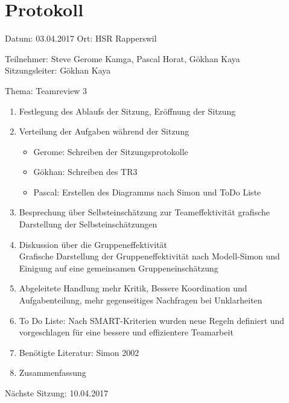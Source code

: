 \chapter{Protokoll}

Datum: 03.04.2017
Ort: HSR Rapperswil

Teilnehmer: Steve Gerome Kamga, Pascal Horat, Gökhan Kaya\\
Sitzungsleiter: Gökhan Kaya

Thema: Teamreview 3

\begin{enumerate}

\item Festlegung des Ablaufs der Sitzung, Eröffnung der Sitzung 

\item  Verteilung der Aufgaben während der Sitzung
\begin{itemize}
\item Gerome: Schreiben der Sitzungsprotokolle
\item Gökhan: Schreiben des TR3
\item Pascal: Erstellen des Diagramms nach Simon und ToDo Liste
\end{itemize}

\item Besprechung über Selbsteinschätzung zur Teameffektivität
 grafische Darstellung der Selbsteinschätzungen

\item Diskussion über die Gruppeneffektivität\\
Grafische Darstellung der Gruppeneffektivität nach Modell-Simon und Einigung auf eine gemeinsamen Gruppeneinschätzung

\item Abgeleitete Handlung
mehr Kritik, Bessere Koordination und Aufgabenteilung, mehr gegenseitiges Nachfragen bei Unklarheiten

\item To Do Liste: Nach SMART-Kriterien wurden neue Regeln definiert und vorgeschlagen für eine bessere und effizientere Teamarbeit

\item Benötigte Literatur: Simon 2002 \cite{simon2002entwicklung}

\item Zusammenfassung

\end{enumerate}

Nächste Sitzung: 10.04.2017